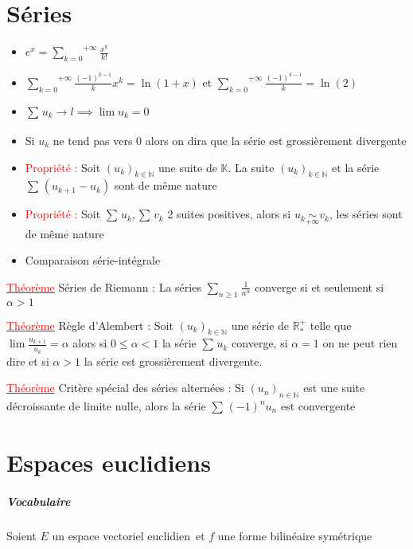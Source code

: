 \documentclass[a4paper, french]{article}
\newcommand{\R}{\mathbb{R}}
\newcommand{\N}{\mathbb{N}}
\newcommand{\K}{\mathbb{K}}
\newcommand{\eve}{espace vectoriel euclidien}
\newcommand{\al}{\alpha}
\newcommand{\som}[2]{\overset{#2}{\underset{#1}{\sum}}}
\newcommand{\thm}{\textcolor{red}{\underline{Théorème} }}
\newcommand{\ppt}{\textcolor{red}{Propriété : }}
\newcommand{\limit}[1]{\underset{#1}{\rightarrow}}
\newcommand{\eq}[1]{\underset{#1}{\sim}}
\newcommand{\inv}[1]{\frac{1}{#1}}
\begin{document}
	\section{Séries}
	\begin{itemize}[label=\(\bullet\)]
 		\item $e^x=\som{k=0}{+\infty}\frac{x^k}{k!}$
 		\item $\som{k=0}{+\infty}\frac{(-1)^{k-1}}{k}x^k=\ln(1+x)$ et $\som{k=0}{+\infty}\frac{(-1)^{k-1}}{k}=\ln(2)$
		\item $\som{}{}u_k \limit{}l \implies \lim u_k=0$
		\item Si $u_k$ ne tend pas vers 0 alors on dira que la série est grossièrement divergente
		\item \ppt Soit $(u_k)_{k \in \N}$ une suite de $\K$. La suite $(u_k)_{k \in \N}$ et la série $\som{}{}(u_{k+1}-u_k)$ sont de même nature
		\item \ppt Soit $\som{}{}u_k,\som{}{}v_k$ 2 suites positives, alors si $u_k \eq{+\infty} v_k$, les séries sont de même nature
		\item Comparaison série-intégrale
	\end{itemize}

	 \thm Séries de Riemann : La séries $\som{n\geqslant 1}{} \inv{n^\al}$ converge si et seulement si $\al > 1$ 
	 
	 \thm Règle d'Alembert : Soit $(u_k)_{k \in \N}$ une série de $\R_*^+$ telle que $\lim \frac{u_{k+1}}{u_k}=\al$ alors si $0 \leqslant \al <1$ la série $\som{}{}u_k$ converge, si $\al=1$ on ne peut rien dire et si $\al>1$ la série est grossièrement divergente. 
	 
	 \thm Critère spécial des séries alternées : Si $(u_n)_{n \in \N}$ est une suite décroissante de limite nulle, alors la série $\som{}{}(-1)^nu_n$ est convergente


	 \section{Espaces euclidiens}
	 
	 \subparagraph{Vocabulaire}
	 
	 Soient \(E\) un \eve \, et $f$ une forme bilinéaire symétrique
	 
\end{document}
